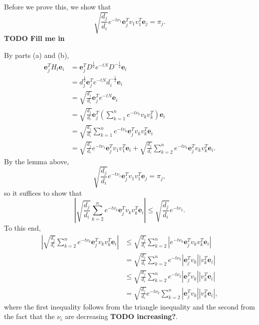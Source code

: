 \documentclass{article}
\newcommand{\todo}[1]{\textbf{TODO #1}}
\newcommand{\1}{\mathbf{1}}
\newcommand{\0}{\mathbf{0}}
\newcommand{\e}{\mathbf{e}}
\begin{document}
\begin{enumerate}
\begin{enumerate}
    Before we prove this, we show that
    \begin{equation*}
      \sqrt{\frac{d_j}{d_i}} e^{-t \nu_1} \e_j^T v_1 v_1^T \e_j = \pi_j.
    \end{equation*}
    \todo{Fill me in}

    By parts (a) and (b),
    \begin{align*}
      \e_j^T H_t \e_i &= \e_j^T D^{\frac{1}{2}} e^{-t N} D^{-\frac{1}{2}} \e_i \\
      & = d_j^{\frac{1}{2}} \e_j^T e^{-t N} d_i^{-\frac{1}{2}} \e_i \\
      & = \sqrt{\frac{d_j}{d_i}} \e_j^T e^{-t N} \e_i \\
      & = \sqrt{\frac{d_j}{d_i}} \e_j^T (\sum_{k = 1}^n e^{-t \nu_k} v_k v_k^T) \e_i \\
      & = \sqrt{\frac{d_j}{d_i}} \sum_{k = 1}^n e^{-t \nu_k} \e_j^T v_k v_k^T \e_i \\
       & = \sqrt{\frac{d_j}{d_i}} e^{-t \nu_1} \e_j^T v_1 v_1^T \e_i + \sqrt{\frac{d_j}{d_i}} \sum_{k = 2}^n e^{-t \nu_k} \e_j^T v_k v_k^T \e_i.
    \end{align*}
    By the lemma above,
    \begin{equation*}
      \sqrt{\frac{d_j}{d_i}} e^{-t \nu_1} \e_j^T v_1 v_1^T \e_j = \pi_j,
    \end{equation*}
    so it suffices to show that
    \begin{equation*}
      \left|\sqrt{\frac{d_j}{d_i}} \sum_{k = 2}^n e^{-t \nu_k} \e_j^T v_k v_k^T \e_i\right| \leq \sqrt{\frac{d_j}{d_i}} e^{-t \nu_2}.
    \end{equation*}
    To this end,
    \begin{align*}
      \left|\sqrt{\frac{d_j}{d_i}} \sum_{k = 2}^n e^{-t \nu_k} \e_j^T v_k v_k^T \e_i\right| & \leq \sqrt{\frac{d_j}{d_i}} \sum_{k = 2}^n \left|e^{-t \nu_k} \e_j^T v_k v_k^T \e_i\right| \\
      & = \sqrt{\frac{d_j}{d_i}} \sum_{k = 2}^n e^{-t \nu_k} \left|\e_j^T v_k\right| \left|v_k^T \e_i\right| \\
      & \leq \sqrt{\frac{d_j}{d_i}} \sum_{k = 2}^n e^{-t \nu_2} \left|\e_j^T v_k\right| \left|v_k^T \e_i\right| \\
      & = \sqrt{\frac{d_j}{d_i}} e^{-t \nu_2} \sum_{k = 2}^n \left|\e_j^T v_k\right| \left|v_k^T \e_i\right|,
    \end{align*}
    where the first inequality follows from the triangle inequality and the second from the fact that the $\nu_i$ are decreasing \todo{increasing?}.

\end{enumerate}
\end{enumerate}
\end{document}
